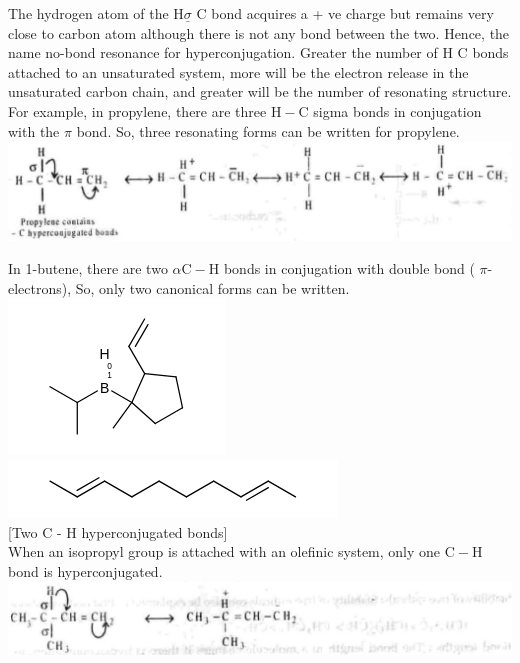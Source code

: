 \documentclass[10pt]{article}
\begin{document}
The hydrogen atom of the $\mathrm{H} \underline{\sigma}$ C bond acquires a + ve charge but remains very close to carbon atom although there is not any bond between the two. Hence, the name no-bond resonance for hyperconjugation. Greater the number of H C bonds attached to an unsaturated system, more will be the electron release in the unsaturated carbon chain, and greater will be the number of resonating structure. For example, in propylene, there are three $\mathrm{H}-\mathrm{C}$ sigma bonds in conjugation with the $\pi$ bond. So, three resonating forms can be written for propylene.\\
\includegraphics[max width=\textwidth, center]{2025_01_28_8470952b98110cec3aabg-081(1)}

In 1-butene, there are two $\alpha \mathrm{C}-\mathrm{H}$ bonds in conjugation with double bond ( $\pi$-electrons), So, only two canonical forms can be written.\\
\includegraphics{smile-54f22045ebc0233fd7c0a8b223ed08836878c430}\\
\includegraphics{smile-164496a8c296c6f699de348f09711bf5b7dff03e}\\[0pt]
[Two C - H hyperconjugated bonds]\\
When an isopropyl group is attached with an olefinic system, only one $\mathrm{C}-\mathrm{H}$ bond is hyperconjugated.\\
\includegraphics[max width=\textwidth, center]{2025_01_28_8470952b98110cec3aabg-081(3)}
\end{document}
